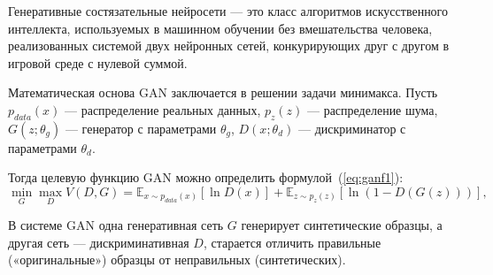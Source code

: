 Генеративные состязательные нейросети --- это класс алгоритмов
искусственного интеллекта, используемых в машинном обучении без
вмешательства человека, реализованных системой двух нейронных сетей,
конкурирующих друг с другом в игровой среде с нулевой суммой.~\cite{gan}

Математическая основа GAN заключается в решении задачи минимакса. Пусть $p_{data}(x)$ --- распределение реальных данных, $p_z(z)$ --- распределение шума, $G(z;\theta_g)$ --- генератор с параметрами $\theta_g$, $D(x;\theta_d)$ --- дискриминатор с параметрами $\theta_d$.

Тогда целевую функцию GAN можно определить формулой~(\ref{eq:ganf1}):
\begin{equation}\label{eq:ganf1}
    \min_G \max_D V(D,G) = \mathbb{E}_{x \sim p_{data}(x)}[\ln D(x)] + \mathbb{E}_{z \sim p_z(z)}[\ln(1-D(G(z)))],
\end{equation}






В системе GAN одна генеративная сеть $G$ генерирует
синтетические образцы, а другая сеть --- дискриминативная $D$, старается отличить правильные («оригинальные») образцы от неправильных (синтетических).~\cite{gan_r}



